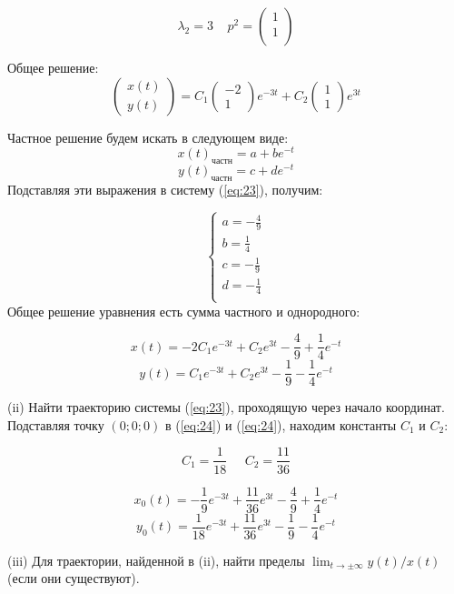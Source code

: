 \documentclass[a4paper, 12pt]{article}
\begin{document}
\[\lambda_2=3\;\;\;\; p^2=
\left(
\begin{array}{cc}
1\\
1\\
\end{array}
\right) 
\]

Общее решение:
\[\left(
\begin{array}{c}
x(t)\\
y(t)
\end{array}
\right)=C_1\left(
\begin{array}{c}
-2 \\
1
\end{array}
\right)e^{-3t}+C_2\left(
\begin{array}{c}
1 \\
1
\end{array}
\right)e^{3t}\]

Частное решение будем искать в следующем виде:
\[x(t)_{\text{частн}}=a+be^{-t}\]
\[y(t)_{\text{частн}}=c+de^{-t}\]
Подставляя эти выражения в систему (\ref{eq:23}), получим:

\[
\left\{
\begin{array}{lr}
a = -\frac {4} {9}\\
b = \frac {1} {4}\\
c = -\frac {1} {9}\\
d = -\frac {1} {4}\\
\end{array}
\right.
\]
Общее решение уравнения есть сумма частного и однородного:

\begin{equation}
x(t) = -2C_1e^{-3t}+C_2e^{3t}-\frac 4 9 + \frac 1 4 e^{-t}
\label{eq:24}
\end{equation}
\begin{equation}
y(t) =C_1e^{-3t}+C_2e^{3t}- \frac 1 9 -\frac 1 4 e^{-t}
\label{eq:25}
\end{equation}

(ii) Найти траекторию системы (\ref{eq:23}), проходящую через начало координат.\\
Подставляя точку $(0;0;0)$ в (\ref{eq:24}) и (\ref{eq:24}), находим константы $C_1$ и $C_2$:

\[C_1 = \frac 1 {18}\;\;\;\;\; C_2 = \frac{11} {36}\]

\[
x_0(t) =-\frac 1 9 e^{-3t}+\frac{11}{36}e^{3t}-\frac 4 9 + \frac 1 4 e^{-t}\]
\[
y_0(t) =\frac 1 {18}e^{-3t}+\frac{11} {36} e^{3t}- \frac 1 9 -\frac 1 4 e^{-t}
\]

(iii) Для траектории, найденной в (ii), найти пределы $\lim_{t\rightarrow\pm\infty}y(t)/x(t)$ (если они существуют).
\end{document}
